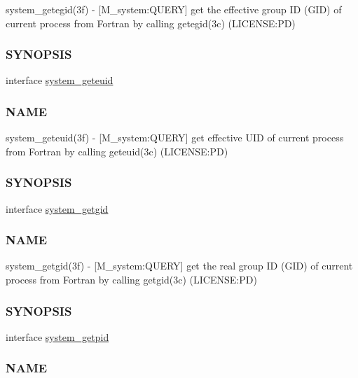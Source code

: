 \begin{DoxyCompactItemize}
\begin{DoxyCompactList}
system\+\_\+getegid(3f) -\/ \mbox{[}M\+\_\+system\+:Q\+U\+E\+RY\mbox{]} get the effective group ID (G\+ID) of current process from Fortran by calling getegid(3c) (L\+I\+C\+E\+N\+SE\+:PD) \subsubsection*{S\+Y\+N\+O\+P\+S\+IS}\end{DoxyCompactList}\item 
interface \mbox{\hyperlink{interfacem__system_1_1system__geteuid}{system\+\_\+geteuid}}
\begin{DoxyCompactList}\small\item\em \subsubsection*{N\+A\+ME}

system\+\_\+geteuid(3f) -\/ \mbox{[}M\+\_\+system\+:Q\+U\+E\+RY\mbox{]} get effective U\+ID of current process from Fortran by calling geteuid(3c) (L\+I\+C\+E\+N\+SE\+:PD) \subsubsection*{S\+Y\+N\+O\+P\+S\+IS}\end{DoxyCompactList}\item 
interface \mbox{\hyperlink{interfacem__system_1_1system__getgid}{system\+\_\+getgid}}
\begin{DoxyCompactList}\small\item\em \subsubsection*{N\+A\+ME}

system\+\_\+getgid(3f) -\/ \mbox{[}M\+\_\+system\+:Q\+U\+E\+RY\mbox{]} get the real group ID (G\+ID) of current process from Fortran by calling getgid(3c) (L\+I\+C\+E\+N\+SE\+:PD) \subsubsection*{S\+Y\+N\+O\+P\+S\+IS}\end{DoxyCompactList}\item 
interface \mbox{\hyperlink{interfacem__system_1_1system__getpid}{system\+\_\+getpid}}
\begin{DoxyCompactList}\small\item\em \subsubsection*{N\+A\+ME}


\end{DoxyCompactList}
\end{DoxyCompactItemize}
